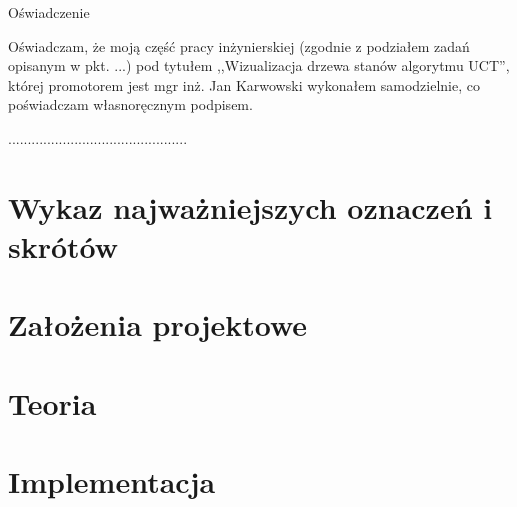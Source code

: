 \documentclass[a4paper,11pt,twoside]{report}
\theoremstyle{definition}
\newcommand{\tytul}{Wizualizacja drzewa stanów algorytmu UCT}
\newcommand{\supervisor}{mgr inż. Jan Karwowski }
\begin{document}
\begin{center}
Oświadczenie
\end{center}

\indent Oświadczam, że moją część pracy inżynierskiej (zgodnie z podziałem zadań opisanym w pkt. ...) pod tytułem ,,\tytul '', której promotorem jest \supervisor wykonałem samodzielnie, co poświadczam własnoręcznym podpisem.
\vspace{2cm}

\begin{flushright}
  \begin{minipage}{50mm}
    \begin{center}
      ..............................................

    \end{center}
  \end{minipage}
\end{flushright}

\thispagestyle{empty}
\newpage

\null\thispagestyle{empty}\newpage


\tableofcontents
\thispagestyle{empty}

\newpage %

\null\thispagestyle{empty}\newpage
\pagestyle{fancy}
\setcounter{page}{11} %

\chapter*{Wykaz najważniejszych oznaczeń i skrótów}


\chapter{Założenia projektowe}


\chapter{Teoria}


\chapter{Implementacja}

\end{document}
